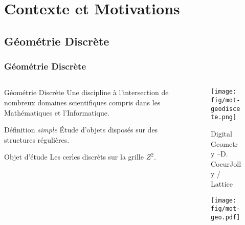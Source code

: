 \documentclass{beamer}
\begin{document}
\section{Contexte et Motivations}

\subsection{Géométrie Discrète}
\begin{frame}
  \frametitle{Géométrie Discrète}

  \begin{columns}[t]
    \begin{column}{6cm}
      \begin{block}{Géométrie Discrète}
        Une discipline à l'intersection de nombreux domaines scientifiques compris dans les Mathématiques et l'Informatique.
      \end{block}
      
      \begin{block}{Définition \textit{simple}}
       Étude d'objets disposés sur des structures régulières.
      \end{block}
      
      \begin{block}{Objet d'étude}
        Les \alert{cerles discrèts} sur la grille $Z^2$.
      \end{block}
    \end{column}

    \begin{column}{4cm}
      \vspace{-0.7cm}
      \begin{figure}[h!]
      \centering
         \texttt{[image: fig/mot-geodiscete.png]}
      \caption{Digital Geometry --D. CoeurJolly / Lattice}
    \end{figure}
    
    \vspace{-1cm}
    \begin{figure}[h!]
      \centering
        \texttt{[image: fig/mot-geo.pdf]}
      \end{figure}
    \end{column}
  \end{columns}  
\end{frame}
\end{document}
